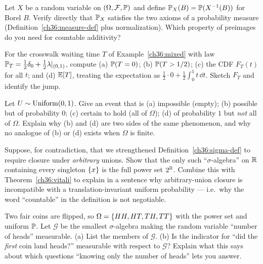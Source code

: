 \begin{exercise}
\label{ch36:ex-pushforward}
Let $X$ be a random variable on $(\Omega, \mathcal{F}, \P)$ and define
$\P_X(B) = \P(X^{-1}(B))$ for Borel $B$. Verify directly that $\P_X$ satisfies the
two axioms of a probability measure (Definition~\ref{ch36:measure-def} plus
normalization). Which property of preimages do you need for countable additivity?
\end{exercise}

\begin{exercise}
\label{ch36:ex-mixed}
For the crosswalk waiting time $T$ of Example~\ref{ch36:mixed} with law
$\P_T = \tfrac12\delta_0 + \tfrac12\lambda|_{(0,1)}$, compute (a) $\P(T = 0)$;
(b) $\P(T > 1/2)$; (c) the CDF $F_T(t)$ for all $t$; and (d) $\E[T]$, treating the
expectation as $\tfrac12 \cdot 0 + \tfrac12 \int_0^1 t\,\dd t$. Sketch $F_T$ and
identify the jump.
\end{exercise}

\begin{exercise}
\label{ch36:ex-as}
Let $U \sim \Unif(0,1)$. Give an event that is (a) impossible (empty);
(b) possible but of probability $0$; (c) certain to hold (all of $\Omega$);
(d) of probability $1$ but \emph{not} all of $\Omega$. Explain why (b) and (d) are
two sides of the same phenomenon, and why no analogue of (b) or (d) exists when
$\Omega$ is finite.
\end{exercise}

\begin{exercise}
\label{ch36:ex-why-countable}
Suppose, for contradiction, that we strengthened
Definition~\ref{ch36:sigma-def} to require closure under \emph{arbitrary} unions.
Show that the only such ``$\sigma$-algebra'' on $\R$ containing every singleton
$\set{x}$ is the full power set $2^{\R}$. Combine this with
Theorem~\ref{ch36:vitali} to explain in a sentence why arbitrary-union closure is
incompatible with a translation-invariant uniform probability --- i.e.\ why the
word ``countable'' in the definition is not negotiable.
\end{exercise}

\begin{exercise}
\label{ch36:ex-info}
Two fair coins are flipped, so $\Omega = \set{HH, HT, TH, TT}$ with the power set and
uniform $\P$. Let $\mathcal{G}$ be the smallest $\sigma$-algebra making the
random variable ``number of heads'' measurable. (a) List the members of
$\mathcal{G}$. (b) Is the indicator for ``did the \emph{first} coin land heads?''
measurable with respect to $\mathcal{G}$? Explain what this says about which
questions ``knowing only the number of heads'' lets you answer.
\end{exercise}

